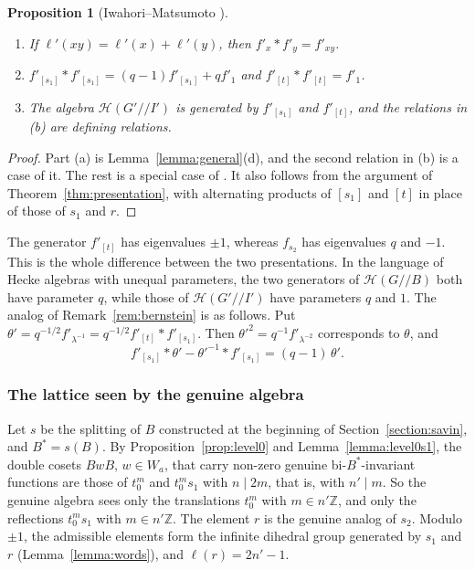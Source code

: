 \documentclass[12pt,letterpaper]{amsart}
\numberwithin{equation}{section}
\newtheorem{proposition}[theorem]{Proposition}
\theoremstyle{definition}
\theoremstyle{remark}
\newcommand{\cH}{\mathcal{H}}
\newcommand{\Z}{\mathbb{Z}}
\begin{document}
\begin{proposition}[Iwahori--Matsumoto {\cite[\S3]{IM65}}]
\label{prop:IMpgl}
\begin{enumerate}[leftmargin=2em,label=(\alph*)]
\item If $\ell'(xy)=\ell'(x)+\ell'(y)$, then $f'_x*f'_y=f'_{xy}$.
\item $f'_{[s_1]}*f'_{[s_1]}=(q-1)f'_{[s_1]}+qf'_1$ and
$f'_{[t]}*f'_{[t]}=f'_1$.
\item The algebra $\cH(G'/\!/I')$ is generated by $f'_{[s_1]}$ and
$f'_{[t]}$, and the relations in (b) are defining relations.
\end{enumerate}
\end{proposition}

\begin{proof}
Part (a) is Lemma~\ref{lemma:general}(d), and the second relation in
(b) is a case of it. The rest is a special case of \cite[\S3]{IM65}. It
also follows from the argument of Theorem~\ref{thm:presentation}, with
alternating products of $[s_1]$ and $[t]$ in place of those of $s_1$
and $r$.
\end{proof}

The generator $f'_{[t]}$ has eigenvalues $\pm1$, whereas $f_{s_2}$ has
eigenvalues $q$ and $-1$. This is the whole difference between the two
presentations. In the language of Hecke algebras with unequal
parameters, the two generators of $\cH(G/\!/B)$ both have parameter
$q$, while those of $\cH(G'/\!/I')$ have parameters $q$ and $1$. The
analog of Remark~\ref{rem:bernstein} is as follows. Put
$\theta'=q^{-1/2}f'_{\lambda^{-1}}=q^{-1/2}f'_{[t]}*f'_{[s_1]}$. Then
$\theta'^2=q^{-1}f'_{\lambda^{-2}}$ corresponds to $\theta$, and
\[
f'_{[s_1]}*\theta'-\theta'^{-1}*f'_{[s_1]}=(q-1)\,\theta' .
\]

\subsubsection{The lattice seen by the genuine algebra}
Let $s$ be the splitting of $B$ constructed at the beginning of
Section~\ref{section:savin}, and $B^*=s(B)$. By
Proposition~\ref{prop:level0} and Lemma~\ref{lemma:level0s1}, the
double cosets $BwB$, $w\in W_a$, that carry non-zero genuine
bi-$B^*$-invariant functions are those of $t_0^m$ and $t_0^ms_1$ with
$n\mid 2m$, that is, with $n'\mid m$. So the genuine algebra sees only
the translations $t_0^m$ with $m\in n'\Z$, and only the reflections
$t_0^ms_1$ with $m\in n'\Z$. The element $r$ is the genuine analog of
$s_2$. Modulo $\pm1$, the admissible elements form the infinite
dihedral group generated by $s_1$ and $r$ (Lemma~\ref{lemma:words}),
and $\ell(r)=2n'-1$.
\end{document}
